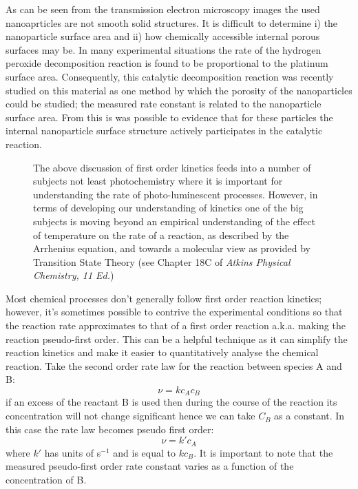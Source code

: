 \documentclass[	DIV=calc,%
							paper=a4,%
							fontsize=11pt,%
							twocolumn]{scrartcl}	 					%
\begin{document}
As can be seen from the transmission electron microscopy images the used nanoaprticles are not smooth solid structures. It is difficult to determine i) the nanoparticle surface area and ii) how chemically accessible internal porous surfaces may be. In many experimental situations the rate of the hydrogen peroxide decomposition reaction is found to be proportional to the platinum surface area. Consequently, this catalytic decomposition reaction was recently studied on this material as one method by which the porosity of the nanoparticles could be studied; the measured rate constant is related to the nanoparticle surface area. From this is was possible to evidence that for these particles the internal nanoparticle surface structure actively participates in the catalytic reaction.
~
\\

\begin{figure}[h]
    \begin{tcolorbox}[[colback=red!5,colframe=red!40!black, title=Looking Forward: Transition State Theory]
        The above discussion of first order kinetics feeds into a number of subjects not least photochemistry where it is important for understanding the rate of photo-luminescent processes. However, in terms of developing our understanding of kinetics one of the big subjects is moving beyond an empirical understanding of the effect of temperature on the rate of a reaction, as described by the Arrhenius equation, and towards a molecular view as provided by Transition State Theory (see Chapter 18C of \emph{Atkins Physical Chemistry, 11 Ed.})
    \end{tcolorbox}
\end{figure}


\newpage
    \begin{tcolorbox}[colback=blue!5,colframe=AirForceBlue!100!black,title= Pseudo-First Order]
        Most chemical processes don't generally follow first order reaction kinetics; however, it's sometimes possible to contrive the experimental conditions so that the reaction rate approximates to that of a first order reaction a.k.a. making the reaction pseudo-first order. This can be a helpful technique as it can simplify the reaction kinetics and make it easier to quantitatively analyse the chemical reaction.
        Take the second order rate law for the reaction between species A and B:
        \begin{equation}
            \nu = k c_A c_B
        \end{equation}
        if an excess of the reactant B is used then during the course of the reaction its concentration will not change significant hence we can take $C_B$ as a constant. In this case the rate law becomes pseudo first order:
        \begin{equation}
            \nu = k' c_A
        \end{equation}
        where $k'$ has units of s$^{-1}$ and is equal to $kc_B$. It is important to note that the measured pseudo-first order rate constant varies as a function of the concentration of B.
    \end{tcolorbox}
\end{document}
